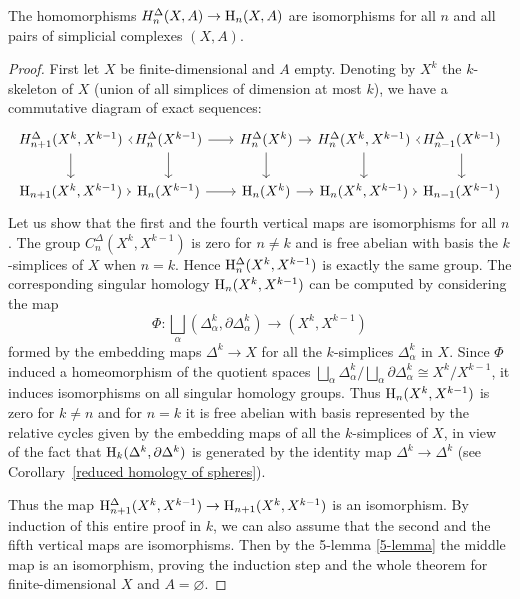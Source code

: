 \begin{thm}
    The homomorphisms $H^\Delta_n(X,A)\to \mathrm{H}_n(X,A)$ are isomorphisms for all $n$ and all pairs of simplicial complexes $(X,A)$.
\end{thm}
\begin{proof}
     First let $X$ be finite-dimensional and $A$ empty. Denoting by $X^k$ the $k$-skeleton of $X$ (union of all simplices of dimension at most $k$), we have a commutative diagram of exact sequences:
     \[\begin{tikzcd}[column sep={70, between origins}]
        H^\Delta_{n+1}(X^k,X^{k-1})\arrow[r]\arrow[d] & H^\Delta_{n}(X^{k-1})\arrow[r]\arrow[d] & H^\Delta_{n}(X^k) \arrow[r]\arrow[d] & H^\Delta_{n}(X^k,X^{k-1})\arrow[d]\arrow[r] & H^\Delta_{n-1}(X^{k-1})\arrow[d] \\
       \rmH_{n+1}(X^k,X^{k-1})\arrow[r] & \rmH_{n}(X^{k-1})\arrow[r] & \rmH_n(X^k)\arrow[r] &\rmH_n(X^k,X^{k-1}) \arrow[r] &\rmH_{n-1}(X^{k-1}) 
    \end{tikzcd}\]
    Let us show that the first and the fourth vertical maps are isomorphisms for all $n$. The group $C_n^\Delta(X^k,X^{k-1})$ is zero for $n\neq k$ and is free abelian with basis the $k$-simplices of $X$ when $n=k$. Hence $\mathrm{H}_n^\Delta(X^k,X^{k-1})$ is exactly the same group. The corresponding singular homology $\mathrm{H}_n(X^k,X^{k-1})$ can be computed by considering the map
    \[\Phi:\bigsqcup_\alpha (\Delta_\alpha^k,\partial\Delta_\alpha^k)\to (X^k,X^{k-1})\]
    formed by the embedding maps $\Delta^k\to X$ for all the $k$-simplices $\Delta_\alpha^k$ in $X$. Since $\Phi$ induced a homeomorphism of the quotient spaces $\bigsqcup_\alpha \Delta^k_\alpha/\bigsqcup_\alpha \partial\Delta_\alpha^k\cong X^k/X^{k-1}$, it induces isomorphisms on all singular homology groups. Thus $\mathrm{H}_n(X^k,X^{k-1})$ is zero for $k\neq n$ and for $n=k$ it is free abelian with basis represented by the relative cycles given by the embedding maps of all the $k$-simplices of $X$, in view of the fact that $\mathrm{H}_k(\Delta^k,\partial\Delta^k)$ is generated by the identity map $\Delta^k\to \Delta^k$ (see Corollary~\ref{reduced homology of spheres}).
    
    Thus the map $ \mathrm{H}_{n+1}^\Delta(X^k,X^{k-1})\to  \mathrm{H}_{n+1}(X^k,X^{k-1})$ is an isomorphism. By induction of this entire proof in $k$, we can also assume that the second and the fifth vertical maps are isomorphisms. Then by the 5-lemma \ref{5-lemma} the middle map is an isomorphism, proving the induction step and the whole theorem for finite-dimensional $X$ and $A=\varnothing$.
    

\end{proof}
